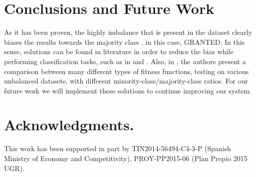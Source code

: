 \documentclass[a4paper,10pt,twocolumn,preprint,3p]{elsarticle}
\begin{document}
\section{Conclusions and Future Work}
\label{sec:future}

As it has been proven, the highly imbalance that is present in the
dataset clearly biases the results towards the majority class
\cite{japkowicz2002class}, in this case, GRANTED. In this sense,
solutions can be found in literature in order to reduce the bias while
performing classification tasks, such as in \cite{chawla2005data} and
\cite{sun2009classification}. Also, in \cite{bhowan2012developing},
the authors present a comparison between many different types of
fitness functions, testing on various unbalanced datasets, with
different minority-class/majority-class ratios. For our future work we
will implement these solutions to continue improving our system. 

\section*{Acknowledgments.}

This work has been supported in part by TIN2014-56494-C4-3-P (Spanish
Ministry of Economy and Competitivity), PROY-PP2015-06 (Plan Propio
2015 UGR). %



\end{document}

